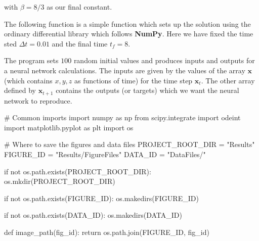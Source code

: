 \documentclass[%
oneside,                 %
final,                   %
10pt]{article}
\begin{document}
with $\beta=8/3$ as our final constant.

The following function is a
simple function which sets up the solution using the ordinary
differential library which follows \textbf{NumPy}. Here we have fixed the
time sted $\Delta t=0.01$ and the final time $t_f=8$.

The program sets $100$ random initial values and produces inputs and outputs for a neural network calculations.
The inputs are given by the values of the array $\bm{x}$ (which contains $x,y,z$ as functions of time) for the time step $\bm{x}_t$.
The other array defined by $\bm{x}_{t+1}$ contains the outputs (or targets) which we want the neural network to reproduce.


























































\bpycod
# Common imports
import numpy as np
from scipy.integrate import odeint
import matplotlib.pyplot as plt
import os

# Where to save the figures and data files
PROJECT_ROOT_DIR = "Results"
FIGURE_ID = "Results/FigureFiles"
DATA_ID = "DataFiles/"

if not os.path.exists(PROJECT_ROOT_DIR):
    os.mkdir(PROJECT_ROOT_DIR)

if not os.path.exists(FIGURE_ID):
    os.makedirs(FIGURE_ID)

if not os.path.exists(DATA_ID):
    os.makedirs(DATA_ID)

def image_path(fig_id):
    return os.path.join(FIGURE_ID, fig_id)
\end{document}
